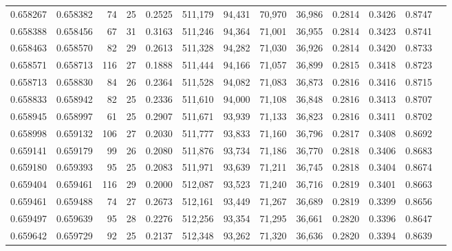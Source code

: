 \begin{tabular}{rrrrrrrrrrrrr}
0.658267 & 0.658382 &    74 &  25 &                                     0.2525 & 511,179 &  94,431 &  70,970 &  36,986 & 0.2814 & 0.3426 & 0.8747 \\
0.658388 & 0.658456 &    67 &  31 &                                     0.3163 & 511,246 &  94,364 &  71,001 &  36,955 & 0.2814 & 0.3423 & 0.8741 \\
0.658463 & 0.658570 &    82 &  29 &                                     0.2613 & 511,328 &  94,282 &  71,030 &  36,926 & 0.2814 & 0.3420 & 0.8733 \\
0.658571 & 0.658713 &   116 &  27 &                                     0.1888 & 511,444 &  94,166 &  71,057 &  36,899 & 0.2815 & 0.3418 & 0.8723 \\
0.658713 & 0.658830 &    84 &  26 &                                     0.2364 & 511,528 &  94,082 &  71,083 &  36,873 & 0.2816 & 0.3416 & 0.8715 \\
0.658833 & 0.658942 &    82 &  25 &                                     0.2336 & 511,610 &  94,000 &  71,108 &  36,848 & 0.2816 & 0.3413 & 0.8707 \\
0.658945 & 0.658997 &    61 &  25 &                                     0.2907 & 511,671 &  93,939 &  71,133 &  36,823 & 0.2816 & 0.3411 & 0.8702 \\
0.658998 & 0.659132 &   106 &  27 &                                     0.2030 & 511,777 &  93,833 &  71,160 &  36,796 & 0.2817 & 0.3408 & 0.8692 \\
0.659141 & 0.659179 &    99 &  26 &                                     0.2080 & 511,876 &  93,734 &  71,186 &  36,770 & 0.2818 & 0.3406 & 0.8683 \\
0.659180 & 0.659393 &    95 &  25 &                                     0.2083 & 511,971 &  93,639 &  71,211 &  36,745 & 0.2818 & 0.3404 & 0.8674 \\
0.659404 & 0.659461 &   116 &  29 &                                     0.2000 & 512,087 &  93,523 &  71,240 &  36,716 & 0.2819 & 0.3401 & 0.8663 \\
0.659461 & 0.659488 &    74 &  27 &                                     0.2673 & 512,161 &  93,449 &  71,267 &  36,689 & 0.2819 & 0.3399 & 0.8656 \\
0.659497 & 0.659639 &    95 &  28 &                                     0.2276 & 512,256 &  93,354 &  71,295 &  36,661 & 0.2820 & 0.3396 & 0.8647 \\
0.659642 & 0.659729 &    92 &  25 &                                     0.2137 & 512,348 &  93,262 &  71,320 &  36,636 & 0.2820 & 0.3394 & 0.8639 \\

\end{tabular}

